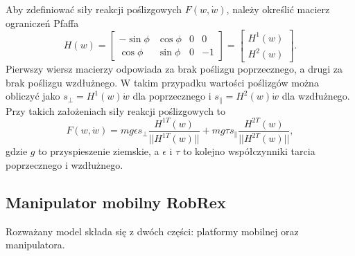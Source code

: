Aby zdefiniować siły reakcji poślizgowych $F(w, \dot{w})$, należy określić macierz ograniczeń Pfaffa
\begin{equation}
H(w)=\begin{bmatrix}
-\sin\phi & \cos\phi & 0 & 0\\
\cos\phi & \sin\phi & 0 & -1
\end{bmatrix}=\begin{bmatrix}
H^1(w)\\
H^2(w)
\end{bmatrix}.
\end{equation}
Pierwszy wiersz macierzy odpowiada za brak poślizgu poprzecznego, a drugi za brak poślizgu wzdłużnego. W takim przypadku wartości poślizgów można obliczyć jako $s_\perp=H^1(w)\dot w$ dla poprzecznego i  $s_\parallel=H^2(w)\dot w$ dla wzdłużnego. Przy takich założeniach siły reakcji poślizgowych to \begin{equation}
F(w, \dot w)=mg\epsilon s_\perp\frac{H^{1T}(w)}{||H^{1T}(w)||} + mg\tau s_\parallel\frac{H^{2T}(w)}{||H^{2T}(w)||},
\end{equation}
gdzie $g$ to przyspieszenie ziemskie, a $\epsilon$ i $\tau$ to kolejno współczynniki tarcia poprzecznego i wzdłużnego.

\subsection{Manipulator mobilny RobRex}
Rozważany model składa się z dwóch części: platformy mobilnej oraz manipulatora. 
